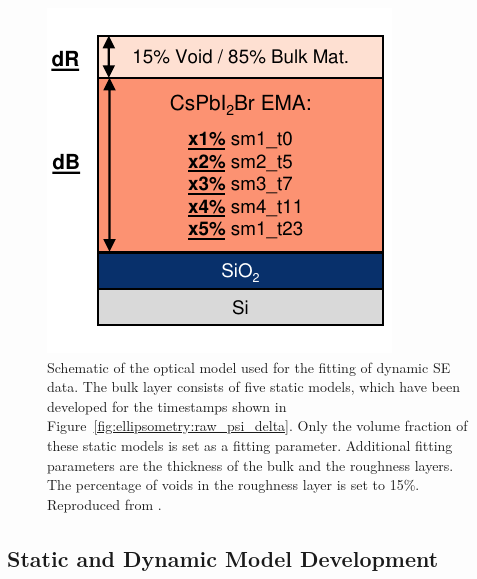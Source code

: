 \begin{figure}
  \centering
  \medskip
  \includegraphics[width=.4\textwidth]{chapters/ellipsometry/image/Dynamic_Model.pdf}
  \caption[Schematic of the optical model used for the fitting of dynamic SE data.]{Schematic of the optical model used for the fitting of dynamic SE data. The bulk layer consists of five static models, which have been developed for the timestamps shown in Figure~\ref{fig:ellipsometry:raw_psi_delta}. Only the volume fraction of these static models is set as a fitting parameter. Additional fitting parameters are the thickness of the bulk and the roughness layers. The percentage of voids in the roughness layer is set to 15\%. Reproduced from \cite{Papadopoulou2024InEllipsometry}.}
  \label{fig:ellipsometry:dynamic_model}
\end{figure}



\subsection{Static and Dynamic Model Development}

